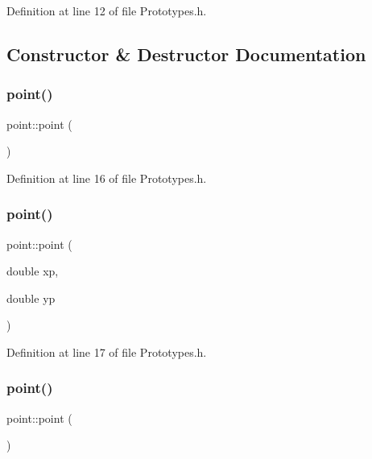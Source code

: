 Definition at line 12 of file Prototypes.\+h.



\subsection{Constructor \& Destructor Documentation}
\mbox{\label{classpoint_a5fe21d4a4539320bf0f5caf1218d31c8}} 
\subsubsection{\texorpdfstring{point()}{point()}\hspace{0.1cm}{\footnotesize\ttfamily [1/6]}}
{\footnotesize\ttfamily point\+::point (\begin{DoxyParamCaption}{ }\end{DoxyParamCaption})\hspace{0.3cm}{\ttfamily [inline]}}



Definition at line 16 of file Prototypes.\+h.

\mbox{\label{classpoint_a35a81eb47d874ab0ad36577aad5fc464}} 
\subsubsection{\texorpdfstring{point()}{point()}\hspace{0.1cm}{\footnotesize\ttfamily [2/6]}}
{\footnotesize\ttfamily point\+::point (\begin{DoxyParamCaption}\item[{double}]{xp,  }\item[{double}]{yp }\end{DoxyParamCaption})\hspace{0.3cm}{\ttfamily [inline]}}



Definition at line 17 of file Prototypes.\+h.

\mbox{\label{classpoint_a5fe21d4a4539320bf0f5caf1218d31c8}} 
\subsubsection{\texorpdfstring{point()}{point()}\hspace{0.1cm}{\footnotesize\ttfamily [3/6]}}
{\footnotesize\ttfamily point\+::point (\begin{DoxyParamCaption}{ }\end{DoxyParamCaption})\hspace{0.3cm}{\ttfamily [inline]}}




